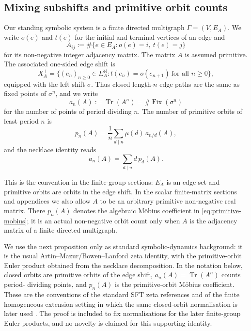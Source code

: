 \documentclass[11pt,a4paper]{amsart}
\theoremstyle{plain}
\theoremstyle{definition}
\theoremstyle{remark}
\DeclareMathOperator{\Tr}{Tr}
\newcommand{\NN}{\mathbb{N}}
\begin{document}
\subsection{Mixing subshifts and primitive orbit counts}

Our standing symbolic system is a finite directed multigraph
\(\Gamma=(V,E_A)\).  We write \(o(e)\) and \(t(e)\) for the initial and
terminal vertices of an edge and
\[
  A_{ij}:=\#\{e\in E_A:o(e)=i,\ t(e)=j\}
\]
for its non-negative integer adjacency matrix.  The matrix \(A\) is
assumed primitive.  The associated one-sided edge shift is
\[
  X_A^+
  =
  \bigl\{(e_n)_{n\ge 0}\in E_A^{\NN}:
    t(e_n)=o(e_{n+1})\ \text{for all }n\ge 0\bigr\},
\]
equipped with the left shift \(\sigma\).  Thus closed length-\(n\) edge
paths are the same as fixed points of \(\sigma^n\), and we write
\[
  a_n(A):=\Tr(A^n)=\#\operatorname{Fix}(\sigma^n)
\]
for the number of points of period dividing \(n\). The number of
primitive orbits of least period \(n\) is
\begin{equation}\label{eq:primitive-mobius}
  p_n(A)=\frac{1}{n}\sum_{d\mid n}\mu(d)\,a_{n/d}(A),
\end{equation}
and the necklace identity reads
\begin{equation}\label{eq:trace-primitive-identity}
  a_n(A)=\sum_{d\mid n}d\,p_d(A).
\end{equation}

This is the convention in the finite-group sections: \(E_A\) is an edge
set and primitive orbits are orbits in the edge shift.  In the scalar
finite-matrix sections and appendices we also allow \(A\) to be an
arbitrary primitive non-negative real matrix.  There \(p_n(A)\) denotes
the algebraic M\"obius coefficient in \eqref{eq:primitive-mobius}; it is
an actual non-negative orbit count only when \(A\) is the adjacency
matrix of a finite directed multigraph.

We use the next proposition only as standard symbolic-dynamics
background: it is the usual Artin--Mazur/Bowen--Lanford zeta identity,
with the primitive-orbit Euler product obtained from the necklace
decomposition.  In the notation below, closed orbits are primitive orbits
of the edge shift, \(a_n(A)=\Tr(A^n)\) counts period-
dividing points, and \(p_n(A)\) is the primitive-orbit M\"obius
coefficient.  These are the conventions of the standard SFT zeta
references
\cite{ArtinMazur1965PeriodicPoints,BowenLanford1970Zeta,LindMarcus1995,ParryPollicott1990Zeta}
and of the finite homogeneous extension setting in which the same
closed-orbit normalisation is later used
\cite{NooraniParry1992ChebotarevShifts}.  The proof is included to fix
normalisations for the later finite-group Euler products, and no novelty is
claimed for this supporting identity.
\end{document}
